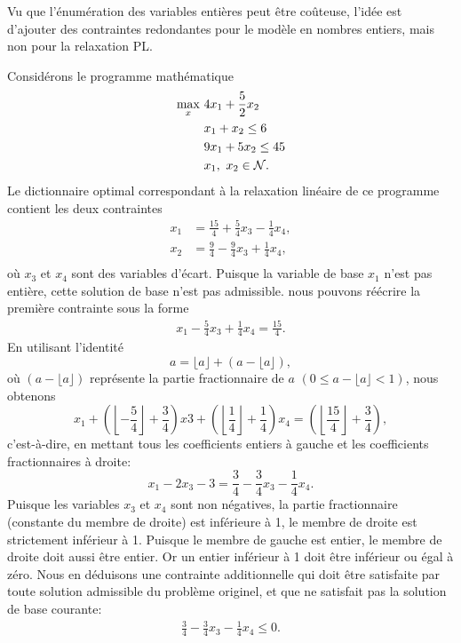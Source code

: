 Vu que l'énumération des variables entières peut être coûteuse, l'idée est d'ajouter des contraintes redondantes pour le modèle en nombres entiers, mais non pour la relaxation PL.

\begin{example}
Considérons le programme mathématique
\begin{align*}
\max_x \ & 4x_1 + \frac{5}{2} x_2 \\
& x_1 + x_2 \leq 6 \\
& 9x_1 + 5x_2 \leq 45 \\
& x_1,\ x_2 \in \mathcal{N}.
\end{align*}
Le dictionnaire optimal correspondant à la relaxation linéaire de ce programme contient les deux contraintes
\begin{align*}
x_1 & = \frac{15}{4} + \frac{5}{4}x_3 - \frac{1}{4}x_4, \\
x_2 & = \frac{9}{4} - \frac{9}{4}x_3 + \frac{1}{4}x_4, \\
\end{align*}
où $x_3$ et $x_4$ sont des variables d'écart.
Puisque la variable de base $x_1$ n'est pas entière, cette solution de
base n'est pas admissible.
nous pouvons réécrire la première contrainte sous la forme
\begin{align*}
x_1 - \frac{5}{4}x_3 + \frac{1}{4}x_4 = \frac{15}{4}.
\end{align*}
En utilisant l'identité
\[
a = \lfloor a \rfloor + (a - \lfloor a \rfloor),
\]
où $(a - \lfloor a \rfloor)$ représente la partie fractionnaire de $a$ $(0 \leq a - \lfloor a \rfloor < 1)$, nous obtenons
\[
x_1 + \left(
\left\lfloor -\frac{5}{4} \right\rfloor + \frac{3}{4} \right)x3 + 
\left(\left\lfloor\frac{1}{4}\right\rfloor + \frac{1}{4} \right) x_4 =
\left(\left\lfloor \frac{15}{4} \right\rfloor + \frac{3}{4} \right),
\]
c'est-à-dire, en mettant tous les coefficients entiers à gauche et les coefficients fractionnaires à droite:
\[
x_1 - 2x_3 - 3 = \frac{3}{4} - \frac{3}{4}x_3 - \frac{1}{4}x_4.
\]
Puisque les variables $x_3$ et $x_4$ sont non négatives, la partie fractionnaire (constante du membre de droite) est inférieure à 1, le membre de droite est strictement inférieur à 1. Puisque le membre de gauche est entier, le membre de droite doit aussi être entier.
Or un entier inférieur à 1 doit être inférieur ou égal à zéro.
Nous en déduisons une contrainte additionnelle qui doit être satisfaite par toute solution admissible du problème originel, et que ne satisfait pas la solution de base courante:
\begin{align*}
\frac{3}{4}-\frac{3}{4}x_3 - \frac{1}{4}x_4 \leq 0.

\end{align*}
\end{example}
